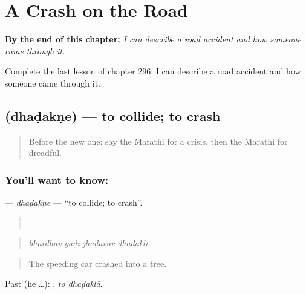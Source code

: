 
\chapter{A Crash on the Road}
\label{ch:mr-a-crash-on-the-road}

\begin{chapteropening}
\textbf{By the end of this chapter:} \emph{I can describe a road accident and how someone came through it.}

Complete the last lesson of chapter 296: I can describe a road accident and how someone came through it.
\end{chapteropening}

\section[\texorpdfstring{\mr{धडकणे} (dhaḍakṇe)}{धडकणे (dhaḍakṇe)}]{ (dhaḍakṇe) — to collide; to crash}

\label{lesson:MR-C296-dhadakne}



\begin{quote}
Before the new one: say the Marathi for a crisis, then the Marathi for dreadful.
\end{quote}

\subsection*{You'll want to know: }
\textbf{} — \emph{dhaḍakṇe} — \textquotedblleft{}to collide; to crash\textquotedblright{}.

\begin{quote}
   .
\end{quote}

\begin{quote}
\emph{bhardhāv gāḍī jhāḍāvar dhaḍaklī.}
\end{quote}

\begin{quote}
The speeding car crashed into a tree.
\end{quote}

Past (he …):  , \emph{to dhaḍaklā}.

